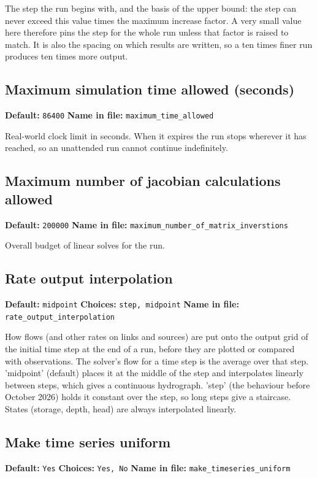 \documentclass[11pt]{article}
\begin{document}
The step the run begins with, and the basis of the upper bound: the step can never exceed this value times the maximum increase factor. A very small value here therefore pins the step for the whole run unless that factor is raised to match. It is also the spacing on which results are written, so a ten times finer run produces ten times more output.
\subsection{Maximum simulation time allowed (seconds)}
{\small \textbf{Default:} \texttt{86400} \quad\textbullet\quad \textbf{Name in file:} \texttt{maximum\_\allowbreak{}time\_\allowbreak{}allowed}}

Real-world clock limit in seconds. When it expires the run stops wherever it has reached, so an unattended run cannot continue indefinitely.
\subsection{Maximum number of jacobian calculations allowed}
{\small \textbf{Default:} \texttt{200000} \quad\textbullet\quad \textbf{Name in file:} \texttt{maximum\_\allowbreak{}number\_\allowbreak{}of\_\allowbreak{}matrix\_\allowbreak{}inverstions}}

Overall budget of linear solves for the run.
\subsection{Rate output interpolation}
{\small \textbf{Default:} \texttt{midpoint} \quad\textbullet\quad \textbf{Choices:} \texttt{step, midpoint} \quad\textbullet\quad \textbf{Name in file:} \texttt{rate\_\allowbreak{}output\_\allowbreak{}interpolation}}

How flows (and other rates on links and sources) are put onto the output grid of the initial time step at the end of a run, before they are plotted or compared with observations. The solver's flow for a time step is the average over that step. 'midpoint' (default) places it at the middle of the step and interpolates linearly between steps, which gives a continuous hydrograph. 'step' (the behaviour before October 2026) holds it constant over the step, so long steps give a staircase. States (storage, depth, head) are always interpolated linearly.
\subsection{Make time series uniform}
{\small \textbf{Default:} \texttt{Yes} \quad\textbullet\quad \textbf{Choices:} \texttt{Yes, No} \quad\textbullet\quad \textbf{Name in file:} \texttt{make\_\allowbreak{}timeseries\_\allowbreak{}uniform}}
\end{document}
